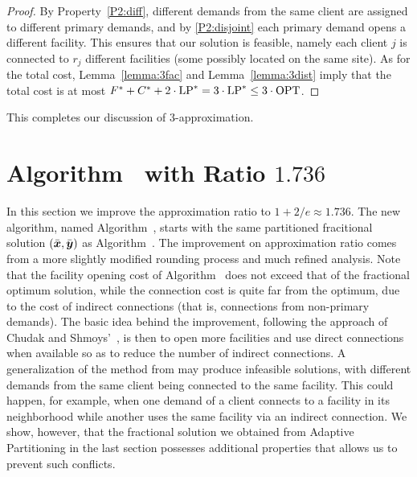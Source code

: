 \documentclass[11pt]{article}
\begin{document}
\begin{proof}
  By Property~\ref{P2:diff}, different demands from the same
  client are assigned to different primary demands, and by
  \ref{P2:disjoint} each primary demand opens a different
  facility. This ensures that our solution is feasible,
  namely each client $j$ is connected to $r_j$ different
  facilities (some possibly located on the same site).  As
  for the total cost, Lemma~\ref{lemma:3fac} and
  Lemma~\ref{lemma:3dist} imply that the total cost is at
  most $F^\ast+C^\ast+2\cdot\mbox{\rm LP}^\ast = 3\cdot\mbox{\rm LP}^\ast \leq
  3\cdot\mbox{\rm OPT}$.
\end{proof}



This completes our discussion of $3$-approximation.


\section{Algorithm~{\ECHU} with Ratio $1.736$}\label{sec: 1.736-approximation}

In this section we improve the approximation ratio to $1+2/e
\approx 1.736$. The new algorithm, named Algorithm~{\ECHU},
starts with the same partitioned fracitional solution
$(\bar{\boldsymbol{x}}, \bar{\boldsymbol{y}})$ as Algorithm~{\EGUP}. The improvement
on approximation ratio comes from a more slightly modified
rounding process and much refined analysis.  Note that the
facility opening cost of Algorithm~{\EGUP} does not exceed
that of the fractional optimum solution, while the
connection cost is quite far from the optimum, due to the
cost of indirect connections (that is, connections from
non-primary demands).  The basic idea behind the
improvement, following the approach of Chudak and
Shmoys'~\cite{ChudakS04}, is then to open more facilities
and use direct connections when available so as to reduce
the number of indirect connections. A {\naive}
generalization of the method from \cite{ChudakS04} may
produce infeasible solutions, with different demands from
the same client being connected to the same facility. This
could happen, for example, when one demand of a client
connects to a facility in its neighborhood while another
uses the same facility via an indirect connection. We show,
however, that the fractional solution we obtained from
Adaptive Partitioning in the last section possesses
additional properties that allows us to prevent such
conflicts.
\end{document}
